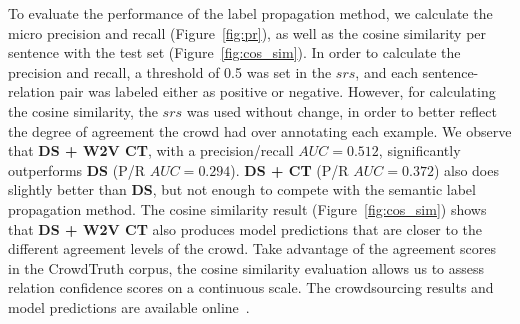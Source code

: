 To evaluate the performance of the label propagation method, we calculate the micro precision and recall (Figure~\ref{fig:pr}), as well as the cosine similarity per sentence with the test set (Figure~\ref{fig:cos_sim}).  In order to calculate the precision and recall, a threshold of 0.5 was set in the $srs$, and each sentence-relation pair was labeled either as positive or negative. However, for calculating the cosine similarity, the $srs$ was used without change, in order to better reflect the degree of agreement the crowd had over annotating each example.  We observe that \textbf{DS + W2V CT}, with a precision/recall $AUC = 0.512$, significantly outperforms \textbf{DS} (P/R $AUC = 0.294$). \textbf{DS + CT} (P/R $AUC = 0.372$) also does slightly better than \textbf{DS}, but not enough to compete with the semantic label propagation method. The cosine similarity result (Figure~\ref{fig:cos_sim}) shows that \textbf{DS + W2V CT} also produces model predictions that are closer to the different agreement levels of the crowd. Take advantage of the agreement scores in the CrowdTruth corpus, the cosine similarity evaluation allows us to assess relation confidence scores on a continuous scale. The crowdsourcing results and model predictions are available online~\cite{crowdODrelexdata2016}.

